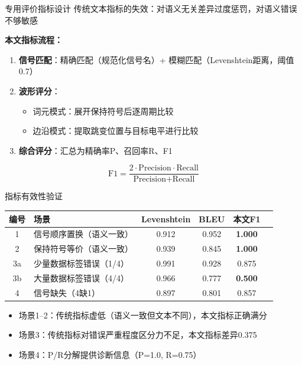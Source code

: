 \documentclass[aspectratio=169,10pt]{beamer}
\begin{document}
\begin{frame}{专用评价指标设计}
传统文本指标的失效：对语义无关差异过度惩罚，对语义错误不够敏感

\vspace{0.5em}
\textbf{本文指标流程：}
\begin{enumerate}
  \item \textbf{信号匹配}：精确匹配（规范化信号名）+ 模糊匹配（Levenshtein距离，阈值0.7）
  \item \textbf{波形评分}：
  \begin{itemize}
    \item 词元模式：展开保持符号后逐周期比较
    \item 边沿模式：提取跳变位置与目标电平进行比较
  \end{itemize}
  \item \textbf{综合评分}：汇总为精确率P、召回率R、F1
\end{enumerate}

\vspace{0.3em}
$$\text{F1} = \frac{2 \cdot \text{Precision} \cdot \text{Recall}}{\text{Precision} + \text{Recall}}$$
\end{frame}

\begin{frame}{指标有效性验证}
\centering
\small
\begin{tabular}{clcccc}
  \toprule
  编号 & 场景 & Levenshtein & BLEU & 本文F1 \\
  \midrule
  1 & 信号顺序置换（语义一致） & 0.912 & 0.952 & \textbf{1.000} \\
  2 & 保持符号等价（语义一致） & 0.939 & 0.845 & \textbf{1.000} \\
  3a & 少量数据标签错误（1/4） & 0.991 & 0.928 & 0.875 \\
  3b & 大量数据标签错误（4/4） & 0.966 & 0.777 & \textbf{0.500} \\
  4 & 信号缺失（4缺1） & 0.897 & 0.801 & 0.857 \\
  \bottomrule
\end{tabular}

\vspace{0.8em}
\begin{itemize}
  \item 场景1--2：传统指标\alert{虚低}（语义一致但文本不同），本文指标正确满分
  \item 场景3：传统指标对错误严重程度\alert{区分力不足}，本文指标差异0.375
  \item 场景4：P/R分解提供诊断信息（P=1.0, R=0.75）
\end{itemize}
\end{frame}
\end{document}
